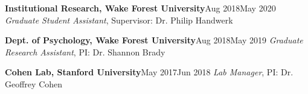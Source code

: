 {%






\entrybig
	{\textbf{Institutional Research, Wake Forest University}}{Aug 2018\textendash May 2020}
	{\textit{Graduate Student Assistant}, Supervisor: Dr. Philip Handwerk}{} %
   

\entrybig
	{\textbf{Dept. of Psychology, Wake Forest University}}{Aug 2018\textendash May 2019}
	{\textit{Graduate Research Assistant}, PI: Dr. Shannon Brady}{} %
  
  
\entrybig
	{\textbf{Cohen Lab, Stanford University}}{May 2017\textendash Jun 2018}
	{\textit{Lab Manager}, PI: Dr. Geoffrey Cohen}{} %


}
